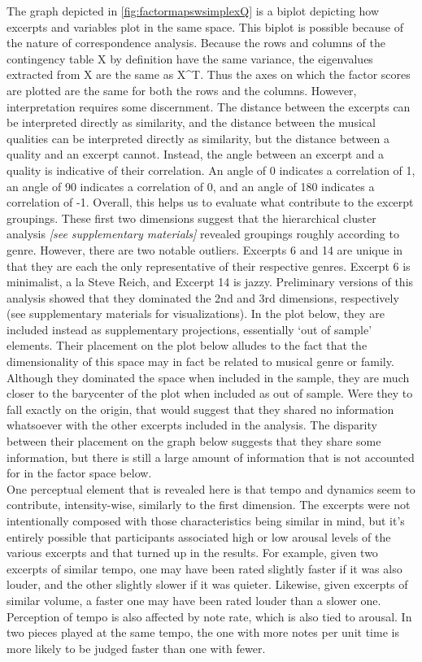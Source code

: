 \documentclass[
  english,
  man,floatsintext]{apa6}
\begin{document}
The graph depicted in \ref{fig:factormapswsimplexQ} is a biplot depicting how excerpts and variables plot in the same space. This biplot is possible because of the nature of correspondence analysis. Because the rows and columns of the contingency table X by definition have the same variance, the eigenvalues extracted from X are the same as X\^{}T. Thus the axes on which the factor scores are plotted are the same for both the rows and the columns. However, interpretation requires some discernment. The distance between the excerpts can be interpreted directly as similarity, and the distance between the musical qualities can be interpreted directly as similarity, but the distance between a quality and an excerpt cannot. Instead, the angle between an excerpt and a quality is indicative of their correlation. An angle of 0 indicates a correlation of 1, an angle of 90 indicates a correlation of 0, and an angle of 180 indicates a correlation of -1.
Overall, this helps us to evaluate what contribute to the excerpt groupings. These first two dimensions suggest that the hierarchical cluster analysis \emph{{[}see supplementary materials{]}} revealed groupings roughly according to genre. However, there are two notable outliers. Excerpts 6 and 14 are unique in that they are each the only representative of their respective genres. Excerpt 6 is minimalist, a la Steve Reich, and Excerpt 14 is jazzy. Preliminary versions of this analysis showed that they dominated the 2nd and 3rd dimensions, respectively (see supplementary materials for visualizations). In the plot below, they are included instead as supplementary projections, essentially `out of sample' elements. Their placement on the plot below alludes to the fact that the dimensionality of this space may in fact be related to musical genre or family. Although they dominated the space when included in the sample, they are much closer to the barycenter of the plot when included as out of sample. Were they to fall exactly on the origin, that would suggest that they shared no information whatsoever with the other excerpts included in the analysis. The disparity between their placement on the graph below suggests that they share some information, but there is still a large amount of information that is not accounted for in the factor space below.\\
One perceptual element that is revealed here is that tempo and dynamics seem to contribute, intensity-wise, similarly to the first dimension. The excerpts were not intentionally composed with those characteristics being similar in mind, but it's entirely possible that participants associated high or low arousal levels of the various excerpts and that turned up in the results. For example, given two excerpts of similar tempo, one may have been rated slightly faster if it was also louder, and the other slightly slower if it was quieter. Likewise, given excerpts of similar volume, a faster one may have been rated louder than a slower one. Perception of tempo is also affected by note rate, which is also tied to arousal. In two pieces played at the same tempo, the one with more notes per unit time is more likely to be judged faster than one with fewer.
\end{document}
